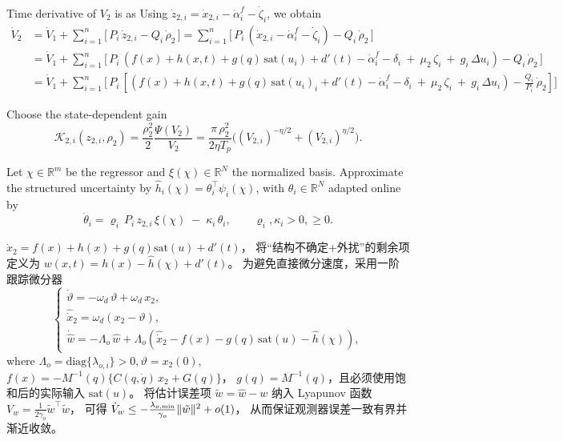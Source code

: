 \documentclass[pdflatex,sn-mathphys-num]{sn-jnl}%
\theoremstyle{thmstyleone}%
\theoremstyle{thmstyletwo}%
\theoremstyle{thmstylethree}%
\begin{document}
Time derivative of $V_2$ is as
Using $\dot z_{2,i}=\dot x_{2,i}-\dot\alpha_i^{f}-\dot\zeta_i$, we obtain
\begin{equation}
	\begin{aligned}
		\dot V_2&=\dot V_1+\sum_{i=1}^n \Big[\,P_i\,\dot z_{2,i}-Q_{i}\,\dot\rho_{2}\,\Big] = \sum_{i=1}^n \Big[\,P_i\,(\dot x_{2,i}-\dot\alpha_i^{f}-\dot\zeta_i)-Q_{i}\,\dot\rho_{2}\,\Big]\\
		&
		 = \dot V_1+\sum_{i=1}^n \Big[\,P_i\,(f(x)+h(x,t)+g(q)\,\mathrm{sat}(u_i)+d'(t)-\dot\alpha_i^{f}-\delta_i\ +\ \mu_2\,\zeta_i\ +\ g_i\,\Delta u_i)-Q_{i}\,\dot\rho_{2}\,\Big]\\
		&
		 = \dot V_1+\sum_{i=1}^n \Big[\,P_i\,[(f(x)+h(x,t)+g(q)\,\mathrm{sat}(u_i)_i+d'(t)-\dot\alpha_i^{f}-\delta_i\ +\ \mu_2\,\zeta_i\ +\ g_i\,\Delta u_i)-\frac{Q_{i}}{P_i}\,\dot\rho_{2}]\Big]
	\end{aligned}
\end{equation}

 Choose the state-dependent gain
\begin{equation}\label{eq:k2-pts}
\mathcal{K}_{2,i}(z_{2,i},\rho_{2})=\frac{\rho_{2}^2}{2}\frac{\Psi(V_{2})}{V_{2}}
=\frac{\pi\,\rho_{2}^2}{2\eta T_p}\Big((V_{2,i})^{-\eta/2}+(V_{2,i})^{\eta/2}\Big).
\end{equation}

Let $\chi\in\mathbb{R}^m$ be the regressor and $\xi(\chi)\in\mathbb{R}^{N}$ the normalized basis. Approximate the structured uncertainty by
\( \hat h_i(\chi)=\theta_i^\top \psi_i(\chi)\),
with $\theta_i\in\mathbb{R}^{N}  $ adapted online by
\begin{equation}\label{eq:theta-law}
\dot\theta_i = \varrho_i\,P_i\,z_{2,i}\,\xi(\chi) \;-\; \kappa_i\,\theta_i,\qquad
\varrho_i,\kappa_i>0, \ge 0.
\end{equation}


$\dot x_2 = f(x)+h(x)+g(q)\mathrm{sat}(u)+d'(t)$，
将“结构不确定+外扰”的剩余项定义为
$w(x,t)=h(x)-\hat h(\chi)+d'(t)$。
为避免直接微分速度，采用一阶跟踪微分器
\begin{equation}
	\begin{cases}
\dot\vartheta =-\omega_d\,\vartheta+\omega_d\,x_2,  \\
\hat{\dot x}_2=\omega_d(x_2-\vartheta),   \\
\dot{\hat w}= -\Lambda_o\,\hat w
+\Lambda_o\left(\hat{\dot x}_2 - f(x) - g(q)\,\mathrm{sat}(u) - \hat h(\chi)\right),
\end{cases}
\end{equation}
where $\Lambda_o=\mathrm{diag}\{\lambda_{o,i}\}>0, \vartheta=x_2(0)$, $f(x)=-M^{-1}(q)\{C(q,\dot q)\,x_2+G(q)\}$，
$g(q)=M^{-1}(q)$，且必须使用饱和后的实际输入 $\mathrm{sat}(u)$。
将估计误差项 $\tilde w=\hat w-w$ 纳入 Lyapunov 函数
$V_w=\tfrac{1}{2\gamma_o}\tilde w^\top\tilde w$，
可得 $\dot V_w\le -\tfrac{\lambda_{o,\min}}{\gamma_o}\|\tilde w\|^2+{\small o}(1)$，
从而保证观测器误差一致有界并渐近收敛。
\end{document}
